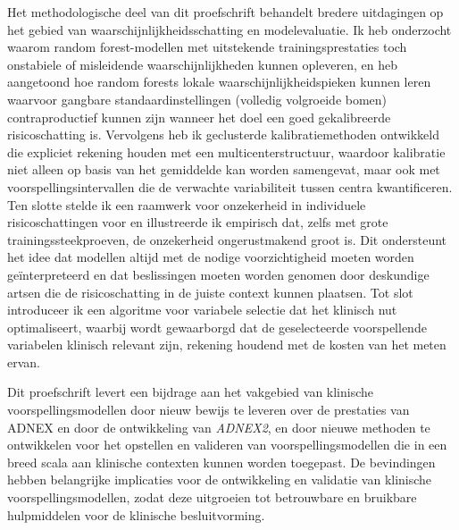 Het methodologische deel van dit proefschrift behandelt bredere uitdagingen op het gebied van waarschijnlijkheidsschatting en modelevaluatie. Ik heb onderzocht waarom random forest-modellen met uitstekende trainingsprestaties toch onstabiele of misleidende waarschijnlijkheden kunnen opleveren, en heb aangetoond hoe random forests lokale waarschijnlijkheidspieken kunnen leren waarvoor gangbare standaardinstellingen (volledig volgroeide bomen) contraproductief kunnen zijn wanneer het doel een goed gekalibreerde risicoschatting is. Vervolgens heb ik geclusterde kalibratiemethoden ontwikkeld die expliciet rekening houden met een multicenterstructuur, waardoor kalibratie niet alleen op basis van het gemiddelde kan worden samengevat, maar ook met voorspellingsintervallen die de verwachte variabiliteit tussen centra kwantificeren. Ten slotte stelde ik een raamwerk voor onzekerheid in individuele risicoschattingen voor en illustreerde ik empirisch dat, zelfs met grote trainingssteekproeven, de onzekerheid ongerustmakend groot is. Dit ondersteunt het idee dat modellen altijd met de nodige voorzichtigheid moeten worden geïnterpreteerd en dat beslissingen moeten worden genomen door deskundige artsen die de risicoschatting in de juiste context kunnen plaatsen. Tot slot introduceer ik een algoritme voor variabele selectie dat het klinisch nut optimaliseert, waarbij wordt gewaarborgd dat de geselecteerde voorspellende variabelen klinisch relevant zijn, rekening houdend met de kosten van het meten ervan.

Dit proefschrift levert een bijdrage aan het vakgebied van klinische voorspellingsmodellen door nieuw bewijs te leveren over de prestaties van \gls{ADNEX} en door de ontwikkeling van \emph{ADNEX2}, en door nieuwe methoden te ontwikkelen voor het opstellen en valideren van voorspellingsmodellen die in een breed scala aan klinische contexten kunnen worden toegepast. De bevindingen hebben belangrijke implicaties voor de ontwikkeling en validatie van klinische voorspellingsmodellen, zodat deze uitgroeien tot betrouwbare en bruikbare hulpmiddelen voor de klinische besluitvorming.